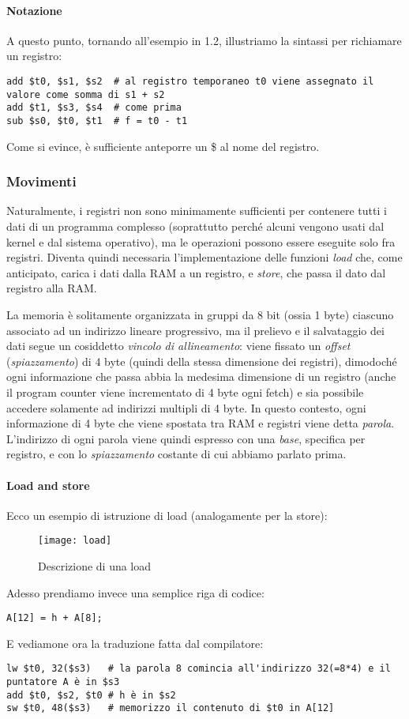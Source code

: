 \paragraph{Notazione}
A questo punto, tornando all'esempio in 1.2, illustriamo la sintassi per richiamare un registro:
\begin{verbatim}
add $t0, $s1, $s2  # al registro temporaneo t0 viene assegnato il valore come somma di s1 + s2
add $t1, $s3, $s4  # come prima
sub $s0, $t0, $t1  # f = t0 - t1
\end{verbatim}
Come si evince, è sufficiente anteporre un \$ al nome del registro.

\subsubsection{Movimenti}
Naturalmente, i registri non sono minimamente sufficienti per contenere tutti i dati di un programma complesso (soprattutto perché alcuni vengono usati dal kernel e dal sistema operativo), ma le operazioni possono essere eseguite solo fra registri. Diventa quindi necessaria l'implementazione delle funzioni \emph{load} che, come anticipato, carica i dati dalla RAM a un registro, e \emph{store}, che passa il dato dal registro alla RAM.

La memoria è solitamente organizzata in gruppi da 8 bit (ossia 1 byte) ciascuno associato ad  un indirizzo lineare progressivo, ma il prelievo e il salvataggio dei dati segue un cosiddetto \emph{vincolo di allineamento}: viene fissato un \emph{offset} (\emph{spiazzamento}) di 4 byte (quindi della stessa dimensione dei registri), dimodoché ogni informazione che passa abbia la medesima dimensione di un registro (anche il program counter viene incrementato di 4 byte ogni fetch) e sia possibile accedere solamente ad indirizzi multipli di 4 byte. In questo contesto, ogni informazione di 4 byte che viene spostata tra RAM e registri viene detta \emph{parola}.\\
L'indirizzo di ogni parola viene quindi espresso con una \emph{base}, specifica per registro, e con lo \emph{spiazzamento} costante di cui abbiamo parlato prima.

\paragraph{Load and store}
Ecco un esempio di istruzione di load (analogamente per la store):
\begin{figure}[H]
	\centering
	\texttt{[image: load]}
	\caption{Descrizione di una load}
\end{figure}
Adesso prendiamo invece una semplice riga di codice:
\begin{verbatim}
A[12] = h + A[8];
\end{verbatim}
E vediamone ora la traduzione fatta dal compilatore:
\begin{verbatim}
lw $t0, 32($s3)   # la parola 8 comincia all'indirizzo 32(=8*4) e il puntatore A è in $s3
add $t0, $s2, $t0 # h è in $s2
sw $t0, 48($s3)   # memorizzo il contenuto di $t0 in A[12]
\end{verbatim}


